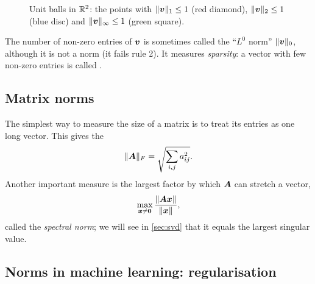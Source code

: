 \begin{figure}[htbp]
\centering
{}
\caption{Unit balls in $\mathbb{R}^2$: the points with $\lVert\bm{v}\rVert_1 \le 1$ (red
  diamond), $\lVert\bm{v}\rVert_2 \le 1$ (blue disc) and $\lVert\bm{v}\rVert_\infty \le 1$ (green
  square).}
\label{fig:unit-balls}
\end{figure}

\begin{remark}
The number of non-zero entries of $\bm{v}$ is sometimes called the ``$L^0$ norm''
$\lVert\bm{v}\rVert_0$, although it is not a norm (it fails rule 2). It measures
\emph{sparsity}: a vector with few non-zero entries is called .
\end{remark}

\subsection{Matrix norms}

The simplest way to measure the size of a matrix is to treat its entries as
one long vector. This gives the 
\[
  \lVert\bm{A}\rVert_F = \sqrt{\sum_{i,j} a_{ij}^2} .
\]
Another important measure is the largest factor by which $\bm{A}$ can stretch a
vector,
\[
  \max_{\bm{x}\neq\bm{0}}\frac{\lVert\bm{A}\bm{x}\rVert}{\lVert\bm{x}\rVert},
\]
called the \emph{spectral norm}; we will see in \cref{sec:svd} that it equals
the largest singular value.

\subsection{Norms in machine learning: regularisation}

